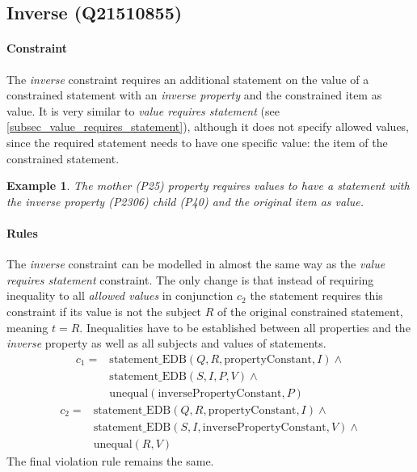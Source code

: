 \documentclass[hyperref,bachelorofscience,fleqn]{cgvpub}
\newtheorem{example}{Example}
\begin{document}
\subsection{Inverse (Q21510855)}\label{subsec_2_inverse}
\paragraph{Constraint}
The \emph{inverse} constraint requires an additional statement on the value of a constrained statement with an \emph{inverse property} and the constrained item as value. It is very similar to \emph{value requires statement} (see \ref{subsec_value_requires_statement}), although it does not specify allowed values, since the required statement needs to have one specific value: the item of the constrained statement.

\begin{example}
The \emph{mother} (P25) property requires values to have a statement with the \emph{inverse property} (P2306) \emph{child} (P40) and the original item as value.
\end{example}

\paragraph{Rules}
The \emph{inverse} constraint can be modelled in almost the same way as the \emph{value requires statement} constraint. The only change is that instead of requiring inequality to all \emph{allowed values} in conjunction \(c_2\) the statement requires this constraint if its value is not the subject \(R\) of the original constrained statement, meaning \(t = R\). Inequalities have to be established between all properties and the \emph{inverse} property as well as all subjects and values of statements.
\begin{equation*}
\begin{split}
c_1 = &\text{statement\_EDB}(Q, R, \text{propertyConstant}, I) \wedge{} \\
&\text{statement\_EDB}(S, I, P, V) \wedge{} \\
&\text{unequal}(\text{inversePropertyConstant}, P)
\end{split}
\end{equation*}
\begin{equation*}
\begin{split}
c_2 = &\text{statement\_EDB}(Q, R, \text{propertyConstant}, I) \wedge{} \\
&\text{statement\_EDB}(S, I, \text{inversePropertyConstant}, V) \wedge{} \\
&\text{unequal}(R, V)
\end{split}
\end{equation*}
The final violation rule remains the same.
\end{document}
